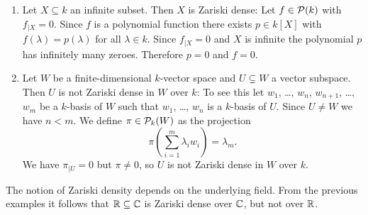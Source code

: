 \begin{expls}
  \begin{enumerate}[label=\emph{\alph*)},leftmargin=*]
    \item 
      Let $X \subseteq k$ an infinite subset. Then $X$ is Zariski dense: Let $f \in \mathcal{P}(k)$ with $f_{|X} = 0$. Since $f$ is a polynomial function there exists $p \in k[X]$ with $f(\lambda) = p(\lambda)$ for all $\lambda \in k$. Since $f_{|X} = 0$ and $X$ is infinite the polynomial $p$ has infinitely many zeroes. Therefore $p = 0$ and $f = 0$.
    \item
      Let $W$ be a finite-dimensional $k$-vector space and $U \subsetneq W$ a vector subspace. Then $U$ is not Zariski dense in $W$ over $k$: To see this let $w_1$, \dots, $w_n$, $w_{n+1}$, \dots, $w_m$ be a $k$-basis of $W$ such that $w_1$, \dots, $w_n$ is a $k$-basis of $U$. Since $U \neq W$ we have $n < m$. We define $\pi \in \mathcal{P}_k(W)$ as the projection
      \[
        \pi\left(\sum_{i=1}^m \lambda_i w_i\right) = \lambda_m.
      \]
      We have $\pi_{|U} = 0$ but $\pi \neq 0$, so $U$ is not Zariski dense in $W$ over $k$.
  \end{enumerate}
\end{expls}


\begin{warn}
  The notion of Zariski density depends on the underlying field. From the previous examples it follows that $\mathbb{R} \subseteq \mathbb{C}$ is Zariski dense over $\mathbb{C}$, but not over $\mathbb{R}$.
\end{warn}



